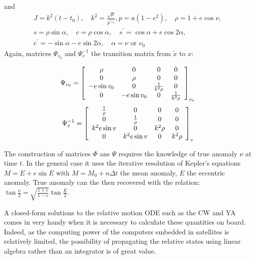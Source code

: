 \begin{itemize}
	and
	\begin{multline}
		J = k^2(t-t_0), \quad k^2 = \frac{\sqrt{\mu}}{p^{^3/_2}}, p=a(1-e^2), \quad \rho = 1+e\cos\nu, \\ 
		s = \rho\sin\alpha, \quad c=\rho\cos\alpha, \quad s^{\prime} = \cos\alpha + e\cos2\alpha, \\
		c ^ { \prime } = -\sin\alpha-e\sin2\alpha, \quad \alpha = \nu \textrm{ or }\nu_0
	\end{multline}{}
	Again, matrices  $\Psi _ { v _ { 0 } }$ and $\Psi _ { v } ^ { - 1 }$ the transition matrix from $\tilde{x}$ to $x$:
	
	\begin{equation}
		\Psi _ { v _ { 0 } } = \left[ \begin{array} { c c c c } { \rho } & { 0 } & { 0 } & { 0 } \\ { 0 } & { \rho } & { 0 } & { 0 } \\ { - e \sin v _ { 0 } } & { 0 } & { \frac { 1 } { k ^ { 2 } \rho } } & { 0 } \\ { 0 } & { - e \sin v _ { 0 } } & { 0 } & { \frac { 1 } { k ^ { 2 } \rho } } \end{array} \right]_ { v_0 }
	\end{equation}{}
	\begin{equation}
		\Psi _ { v } ^{- 1} = \left[ \begin{array} { c c c c } { \frac { 1 } { \rho } } & { 0 } & { 0 } & { 0 } \\ { 0 } & { \frac { 1 } { \rho } } & { 0 } & { 0 } \\ { k ^ { 2 } e \sin v } & { 0 } & { k ^ { 2 } \rho } & { 0 } \\ { 0 } & { k ^ { 2 } e \sin v } & { 0 } & { k ^ { 2 } \rho } \end{array} \right] _ { v }
	\end{equation}{}
\end{itemize}{}

The construction of matrices $\Phi$ ans $\Psi$ requires the knowledge of true anomaly $\nu$ at time $t$. In the general case it uses the iterative resolution of Kepler's equations $M = E + e\sin E$ with $M = M_0 + n\Delta t$ the mean anomaly, $E$ the eccentric anomaly. True anomaly can the then recovered with the relation: $\tan\frac{\nu}{2} = \sqrt{\frac{1+e}{1-e}}\tan\frac{E}{2}$.

A closed-form solutions to the relative motion \gls{ODE} such as the \gls{CW} and \gls{YA} comes in very handy when it is necessary to calculate these quantities on board. Indeed, as the computing power of the computers embedded in satellites is relatively limited, the possibility of propagating the relative states using linear algebra rather than an integrator is of great value.


